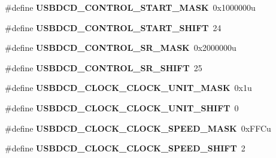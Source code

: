 \begin{DoxyCompactItemize}
\item 
\#define {\bfseries U\+S\+B\+D\+C\+D\+\_\+\+C\+O\+N\+T\+R\+O\+L\+\_\+\+S\+T\+A\+R\+T\+\_\+\+M\+A\+SK}~0x1000000u\hypertarget{group__USBDCD__Register__Masks_ga02bb74c9b2d9fd907d02b72ec4f2dc0c}{}\label{group__USBDCD__Register__Masks_ga02bb74c9b2d9fd907d02b72ec4f2dc0c}

\item 
\#define {\bfseries U\+S\+B\+D\+C\+D\+\_\+\+C\+O\+N\+T\+R\+O\+L\+\_\+\+S\+T\+A\+R\+T\+\_\+\+S\+H\+I\+FT}~24\hypertarget{group__USBDCD__Register__Masks_ga8a353cada7464a5898998c45b2caabb5}{}\label{group__USBDCD__Register__Masks_ga8a353cada7464a5898998c45b2caabb5}

\item 
\#define {\bfseries U\+S\+B\+D\+C\+D\+\_\+\+C\+O\+N\+T\+R\+O\+L\+\_\+\+S\+R\+\_\+\+M\+A\+SK}~0x2000000u\hypertarget{group__USBDCD__Register__Masks_ga7455215193ec55d79026af2e09a7523f}{}\label{group__USBDCD__Register__Masks_ga7455215193ec55d79026af2e09a7523f}

\item 
\#define {\bfseries U\+S\+B\+D\+C\+D\+\_\+\+C\+O\+N\+T\+R\+O\+L\+\_\+\+S\+R\+\_\+\+S\+H\+I\+FT}~25\hypertarget{group__USBDCD__Register__Masks_ga122056290d48016111c0a5e3cb8b63c4}{}\label{group__USBDCD__Register__Masks_ga122056290d48016111c0a5e3cb8b63c4}

\item 
\#define {\bfseries U\+S\+B\+D\+C\+D\+\_\+\+C\+L\+O\+C\+K\+\_\+\+C\+L\+O\+C\+K\+\_\+\+U\+N\+I\+T\+\_\+\+M\+A\+SK}~0x1u\hypertarget{group__USBDCD__Register__Masks_ga7c8eace6dde39098426fe04c6b32bf92}{}\label{group__USBDCD__Register__Masks_ga7c8eace6dde39098426fe04c6b32bf92}

\item 
\#define {\bfseries U\+S\+B\+D\+C\+D\+\_\+\+C\+L\+O\+C\+K\+\_\+\+C\+L\+O\+C\+K\+\_\+\+U\+N\+I\+T\+\_\+\+S\+H\+I\+FT}~0\hypertarget{group__USBDCD__Register__Masks_gae3126a9608c08fe560b91f7b742bb98a}{}\label{group__USBDCD__Register__Masks_gae3126a9608c08fe560b91f7b742bb98a}

\item 
\#define {\bfseries U\+S\+B\+D\+C\+D\+\_\+\+C\+L\+O\+C\+K\+\_\+\+C\+L\+O\+C\+K\+\_\+\+S\+P\+E\+E\+D\+\_\+\+M\+A\+SK}~0x\+F\+F\+Cu\hypertarget{group__USBDCD__Register__Masks_gaf53eaecf9a4de0251c8906350ac989ae}{}\label{group__USBDCD__Register__Masks_gaf53eaecf9a4de0251c8906350ac989ae}

\item 
\#define {\bfseries U\+S\+B\+D\+C\+D\+\_\+\+C\+L\+O\+C\+K\+\_\+\+C\+L\+O\+C\+K\+\_\+\+S\+P\+E\+E\+D\+\_\+\+S\+H\+I\+FT}~2\hypertarget{group__USBDCD__Register__Masks_gaa1667808247c5b8355c58b93a4e80c8a}{}\label{group__USBDCD__Register__Masks_gaa1667808247c5b8355c58b93a4e80c8a}


\end{DoxyCompactItemize}
